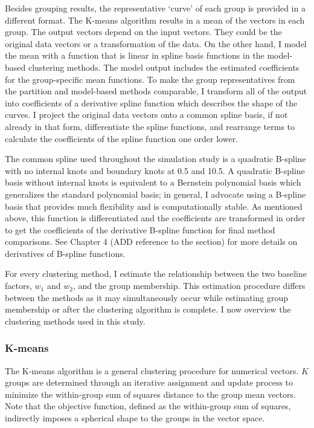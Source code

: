 Besides grouping results, the representative `curve' of each group is provided in a different format. The K-means algorithm results in a mean of the vectors in each group. The output vectors depend on the input vectors. They could be the original data vectors or a transformation of the data. On the other hand, I model the mean with a function that is linear in spline basis functions in the model-based clustering methods. The model output includes the estimated coefficients for the group-specific mean functions. To make the group representatives from the partition and model-based methods comparable, I transform all of the output into coefficients of a derivative spline function which describes the shape of the curves. I project the original data vectors onto a common spline basis, if not already in that form, differentiate the spline functions, and rearrange terms to calculate the coefficients of the spline function one order lower. 

The common spline used throughout the simulation study is a quadratic B-spline with no internal knots and boundary knots at 0.5 and 10.5. A quadratic B-spline basis without internal knots is equivalent to a Bernstein polynomial basis \cite{lorentz1953} which generalizes the standard polynomial basis; in general, I advocate using a B-spline basis that provides much flexibility and is computationally stable.  As mentioned above, this function is differentiated and the coefficients are transformed in order to get the coefficients of the derivative B-spline function for final method comparisons. See Chapter 4 (ADD reference to the section) for more details on derivatives of B-spline functions.

For every clustering method, I estimate the relationship between the two baseline factors, $w_{1}$ and $w_{2}$, and the group membership. This estimation procedure differs between the methods as it may simultaneously occur while estimating group membership or after the clustering algorithm is complete. I now overview the clustering methods used in this study.

\subsubsection{K-means}
The K-means algorithm is a general clustering procedure for numerical vectors. $K$ groups are determined through an iterative assignment and update process to minimize the within-group sum of squares distance to the group mean vectors. Note that the objective function, defined as the within-group sum of squares, indirectly imposes a spherical shape to the groups in the vector space.

